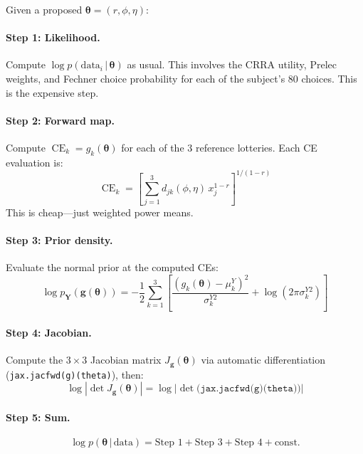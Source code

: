 \documentclass[11pt,a4paper]{article}
\theoremstyle{definition}
\newcommand{\given}{\,|\,}
\newcommand{\btheta}{\boldsymbol{\theta}}
\DeclareMathOperator{\CE}{CE}
\begin{document}
Given a proposed $\btheta = (r, \phi, \eta)$:

\paragraph{Step 1: Likelihood.} Compute $\log p(\text{data}_i \given \btheta)$
as usual. This involves the CRRA utility, Prelec weights, and Fechner choice
probability for each of the subject's 80 choices. This is the expensive step.

\paragraph{Step 2: Forward map.} Compute $\CE_k = g_k(\btheta)$ for each of
the 3 reference lotteries. Each CE evaluation is:
\begin{equation}
    \CE_k = \left[\sum_{j=1}^3 d_{jk}(\phi, \eta) \,
    x_j^{1-r}\right]^{1/(1-r)}
\end{equation}
This is cheap---just weighted power means.

\paragraph{Step 3: Prior density.} Evaluate the normal prior at the computed
CEs:
\begin{equation}
    \log p_{\mathbf{Y}}(\mathbf{g}(\btheta))
    = -\frac{1}{2} \sum_{k=1}^3 \left[
    \frac{(g_k(\btheta) - \mu_k^Y)^2}{\sigma_k^{Y2}}
    + \log(2\pi\sigma_k^{Y2})
    \right]
\end{equation}

\paragraph{Step 4: Jacobian.} Compute the $3 \times 3$ Jacobian matrix
$J_{\mathbf{g}}(\btheta)$ via automatic differentiation
(\texttt{jax.jacfwd(g)(theta)}), then:
\begin{equation}
    \log|\!\det J_{\mathbf{g}}(\btheta)| =
    \log\big|\!\det\big(\texttt{jax.jacfwd(g)(theta)}\big)\big|
\end{equation}

\paragraph{Step 5: Sum.}
\begin{equation}
    \log p(\btheta \given \text{data}) = \text{Step 1} + \text{Step 3}
    + \text{Step 4} + \text{const.}
\end{equation}
\end{document}

